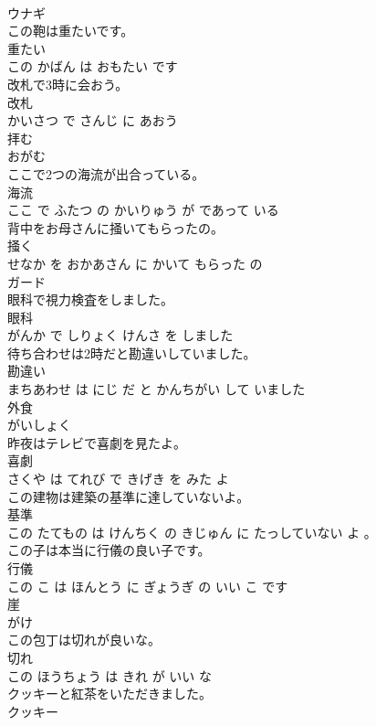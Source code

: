 \documentclass[8pt]{extreport}
\begin{document}
\begin{CJK}{UTF8}{min}
\\	ウナギ	
\\	この鞄は重たいです。	
\\	重たい 
\\	この かばん は おもたい です			
\\	改札で3時に会おう。	
\\	改札 
\\	かいさつ で さんじ に あおう			
\\	拝む	
\\	おがむ		
\\	ここで2つの海流が出合っている。	
\\	海流 
\\	ここ で ふたつ の かいりゅう が であって いる			
\\	背中をお母さんに掻いてもらったの。	
\\	掻く 
\\	せなか を おかあさん に かいて もらった の			
\\	ガード	
\\	眼科で視力検査をしました。	
\\	眼科 
\\	がんか で しりょく けんさ を しました			
\\	待ち合わせは2時だと勘違いしていました。	
\\	勘違い 
\\	まちあわせ は にじ だ と かんちがい して いました			
\\	外食	
\\	がいしょく		
\\	昨夜はテレビで喜劇を見たよ。	
\\	喜劇 
\\	さくや は てれび で きげき を みた よ			
\\	この建物は建築の基準に達していないよ。	
\\	基準 
\\	この たてもの は けんちく の きじゅん に たっしていない よ 。			
\\	この子は本当に行儀の良い子です。	
\\	行儀 
\\	この こ は ほんとう に ぎょうぎ の いい こ です			
\\	崖	
\\	がけ		
\\	この包丁は切れが良いな。	
\\	切れ 
\\	この ほうちょう は きれ が いい な			
\\	クッキーと紅茶をいただきました。	
\\	クッキー 

\end{CJK}
\end{document}
